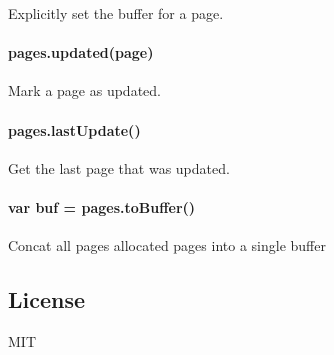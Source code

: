 Explicitly set the buffer for a page.

\paragraph*{{\ttfamily pages.\+updated(page)}}

Mark a page as updated.

\paragraph*{{\ttfamily pages.\+last\+Update()}}

Get the last page that was updated.

\paragraph*{{\ttfamily var buf = pages.\+to\+Buffer()}}

Concat all pages allocated pages into a single buffer

\subsection*{License}

M\+IT 